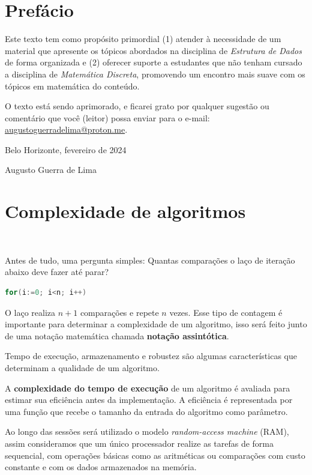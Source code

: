 \section*{Prefácio}

Este texto tem como propósito primordial (1) atender à necessidade de um material que apresente os tópicos abordados na disciplina de \textit{Estrutura de Dados} de forma organizada e (2) oferecer suporte a estudantes que não tenham cursado a disciplina de \textit{Matemática Discreta}, promovendo um encontro mais suave com os tópicos em matemática do conteúdo.

O texto está sendo aprimorado, e ficarei grato por qualquer sugestão ou comentário que você (leitor) possa enviar para o e-mail: \href{mailto:augustoguerradelima@proton.me}{augustoguerradelima@proton.me}.
\vspace{0.5cm}

{\raggedleft
Belo Horizonte, fevereiro de 2024

Augusto Guerra de Lima
\par}

\newpage
\section{Complexidade de algoritmos}
\

Antes de tudo, uma pergunta simples: Quantas comparações o laço de iteração abaixo deve fazer até parar?

\begin{lstlisting}[language=C, frame=single]
    for(i:=0; i<n; i++)
\end{lstlisting}

O laço realiza $n+1$ comparações e repete $n$ vezes. Esse tipo de contagem é importante para determinar a complexidade de um algoritmo, isso será feito junto de uma notação matemática chamada \textbf{notação assintótica}.

Tempo de execução, armazenamento e robustez são algumas características que determinam a qualidade de um algoritmo.

A \textbf{complexidade do tempo de execução} de um algoritmo é avaliada para estimar sua eficiência antes da implementação. A eficiência é representada por uma função que recebe o tamanho da entrada do algoritmo como parâmetro.

Ao longo das sessões será utilizado o modelo \textit{random-access machine} (RAM), assim consideramos que um único processador realize as tarefas de forma sequencial, com operações básicas como as aritméticas ou comparações com custo constante e com os dados armazenados na memória.

